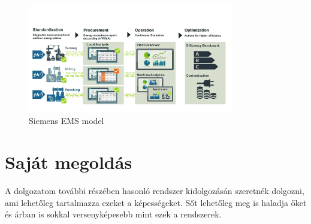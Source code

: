 \begin{figure}
    \centering
    \includegraphics[width=0.8\textwidth]{figures/sieEMS.png}
    \caption{Siemens EMS model\cite{sieEMS}}
    \label{fig:siemens-ems}
\end{figure}

\section{Saját megoldás}

A dolgozatom további részében hasonló rendszer kidolgozásán szeretnék dolgozni, ami lehetőleg tartalmazza
ezeket a képességeket. Sőt lehetőleg meg is haladja őket és árban is sokkal versenyképesebb mint ezek a rendszerek.